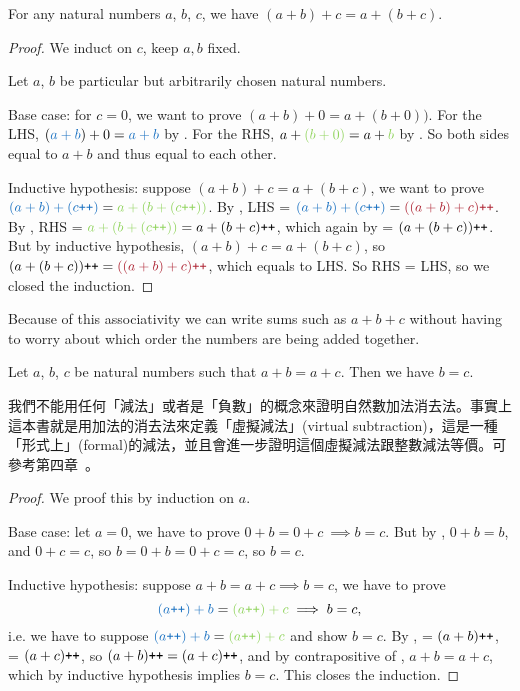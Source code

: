 \begin{proposition}\label{prop 2.2.5}
For any natural numbers \(a\), \(b\), \(c\), we have \((a + b) + c = a + (b + c)\).
\end{proposition}
\begin{proof}
We induct on \(c\), keep \(a, b\) fixed.

Let \(a\), \(b\) be particular but arbitrarily chosen natural numbers.

Base case: for \(c = 0\), we want to prove \((a + b) + 0 = a + (b + 0))\). For the LHS, \((\BLUE{a + b}) + 0 = \BLUE{a + b}\) by . For the RHS, \(a + \GREEN{(b + 0)} = a + \GREEN{b}\) by . So both sides equal to \(a + b\) and thus equal to each other.

Inductive hypothesis: suppose \((a + b) + c = a + (b + c)\), we want to prove \(\BLUE{(a + b) + (c\INC)} = \GREEN{a + (b + (c\INC))}\). By , LHS = \(\BLUE{(a + b) + (c\INC)} = \MAROON{((a + b) + c)\INC}\). By , RHS = \(\GREEN{a + (b + (c\INC))} = a + (b + c)\INC\), which again by  = \((a + (b + c))\texttt{++}\). But by inductive hypothesis, \((a + b) + c = a + (b + c)\), so \((a + (b + c))\INC = \MAROON{((a + b) + c)\INC}\), which equals to LHS. So RHS = LHS, so we closed the induction.
\end{proof}

\begin{note}
Because of this associativity we can write sums such as \(a + b + c\) without having to worry about which order the numbers are being added together.
\end{note}

\begin{proposition}\label{prop 2.2.6} Let \(a\), \(b\), \(c\) be natural numbers such that \(a + b = a + c\). Then we have \(b = c\).
\end{proposition}
\begin{note}
我們不能用任何「減法」或者是「負數」的概念來證明自然數加法消去法。事實上這本書就是用加法的消去法來定義「虛擬減法」(virtual subtraction)，這是一種「形式上」(formal)的減法，並且會進一步證明這個虛擬減法跟整數減法等價。可參考第四章\ 。
\end{note}
\begin{proof}
We proof this by induction on \(a\).

Base case: let \(a = 0\), we have to prove \(0 + b = 0 + c\ \implies b = c\). But by , \(0 + b = b\), and \(0 + c = c\), so \(b = 0 + b = 0 + c = c\), so \(b = c\).

Inductive hypothesis: suppose \(a + b = a + c \implies b = c\), we have to prove
\[\BLUE{(a\INC) + b} = \GREEN{(a\INC) + c} \implies b = c,\]
i.e. we have to suppose \(\BLUE{(a\INC) + b} = \GREEN{(a\INC) + c}\) and show \(b = c\).
By ,  = \((a + b)\texttt{++}\),  = \((a + c)\texttt{++}\), so \((a + b)\texttt{++} = (a + c)\texttt{++}\), and by contrapositive of , \(a + b = a + c\), which by inductive hypothesis implies \(b = c\). This closes the induction.
\end{proof}

